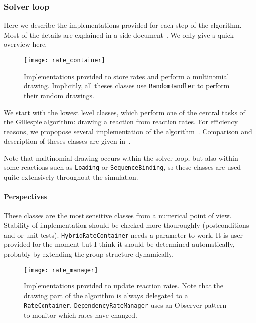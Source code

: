 \subsubsection{Solver loop}

Here we describe the implementations provided for each step of the algorithm. Most of the details are explained in a side document~\citep{cati}. We only give a quick overview here.


\begin{figure}[!h]
  \centering
  \texttt{[image: rate\_container]}
  \caption{Implementations provided to store rates and perform a multinomial drawing. Implicitly, all theses classes use \texttt{RandomHandler} to perform their random drawings. }
  \label{fig:rate_container}
\end{figure}

We start with the lowest level classes, which perform one of the central tasks of the Gillespie algorithm: drawing a reaction from reaction rates. For efficiency reasons, we propopose several implementation of the algorithm~. Comparison and description of theses classes are given in~\citet{cati}. 

Note that multinomial drawing occurs within the solver loop, but also within some reactions such as \texttt{Loading} or \texttt{SequenceBinding}, so these classes are used quite extensively throughout the simulation.

\paragraph{Perspectives} These classes are the most sensitive classes from a numerical point of view. Stability of implementation should be checked more thouroughly (postconditions and or unit tests). \texttt{HybridRateContainer} needs a parameter to work. It is user provided for the moment but I think it should be determined automatically, probably by extending the group structure dynamically.


\begin{figure}[!h]
  \centering
  \texttt{[image: rate\_manager]}
  \caption{Implementations provided to update reaction rates. Note that the drawing part of the algorithm is always delegated to a \texttt{RateContainer}. \texttt{DependencyRateManager} uses an Observer pattern to monitor which rates have changed.}
  \label{fig:rate_manager}
\end{figure}

